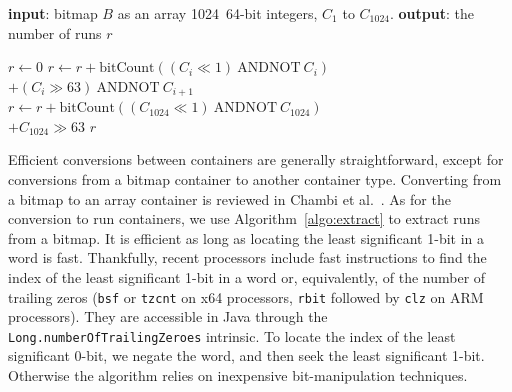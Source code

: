 \documentclass[times]{speauth}
\begin{document}
\begin{algorithm}
\caption{\label{algo:countruns}Routine to compute the number of runs in a bitmap. The left and right shift operators ($\ll{}$ and $\gg{}$) move all bits in a word by the specified number of bits, shifting in zeros. By convention $C\gg{}63$ is the value (1 or 0) of the last bit of the word. We use the bitwise AND~NOT operator.
 }
\centering
\begin{algorithmic}[1]
\STATE \textbf{input}: bitmap $B$ as an array \num{1024}~64-bit integers, $C_1$ to $C_{1024}$.
\STATE \textbf{output}: the number of runs $r$

\STATE $r \leftarrow 0$
\STATE $r \leftarrow r + \mathrm{bitCount}(
(C_i\ll{} 1) \mathrm{~AND NOT~} C_{i} ) $ \\
\hspace{1cm}
$+
(C_i\gg{}63) \mathrm{~AND NOT~} C_{i+1}$
\ENDFOR
\STATE  $r \leftarrow r + \mathrm{bitCount}(
(C_{1024}\ll{} 1) \mathrm{~AND NOT~} C_{1024} ) $ \\
\hspace{1cm}
$
+ C_{1024}\gg{}63
$
\RETURN $r$
\end{algorithmic}
\end{algorithm}



Efficient conversions between containers are generally straightforward, except for conversions from a bitmap container to another container type. Converting from a bitmap to an array container is reviewed in Chambi et al.~\cite{SPE:SPE2325}. As for the conversion to run containers,
we use Algorithm~\ref{algo:extract} to extract runs from a bitmap.
It is efficient as long as locating the least significant 1-bit in a word is fast.
Thankfully, recent processors include fast instructions to find the index of
the least significant 1-bit in a word or, equivalently, of the number
of trailing zeros (\texttt{bsf} or \texttt{tzcnt} on x64 processors,
\texttt{rbit}  followed by \texttt{clz} on ARM processors). They are accessible in Java through  the \texttt{Long.numberOfTrailingZeroes} intrinsic.
To locate the index of the least significant 0-bit, we  negate the word, and then seek the least significant 1-bit. Otherwise the algorithm relies on inexpensive bit-manipulation techniques.
\end{document}
